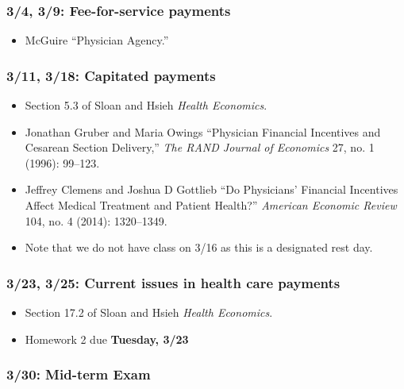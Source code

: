 \documentclass[11pt,]{article}
\providecommand{\tightlist}{%
  \setlength{\itemsep}{0pt}\setlength{\parskip}{0pt}}
\begin{document}
\hypertarget{fee-for-service-payments}{%
\subsubsection{3/4, 3/9: Fee-for-service
payments}\label{fee-for-service-payments}}

\begin{itemize}
\tightlist
\item
  McGuire ``Physician Agency.''
\end{itemize}

\hypertarget{capitated-payments}{%
\subsubsection{3/11, 3/18: Capitated
payments}\label{capitated-payments}}

\begin{itemize}
\tightlist
\item
  Section 5.3 of Sloan and Hsieh \emph{Health Economics}.
\item
  Jonathan Gruber and Maria Owings ``Physician Financial Incentives and
  Cesarean Section Delivery,'' \emph{The RAND Journal of Economics} 27,
  no. 1 (1996): 99--123.
\item
  Jeffrey Clemens and Joshua D Gottlieb ``Do Physicians' Financial
  Incentives Affect Medical Treatment and Patient Health?''
  \emph{American Economic Review} 104, no. 4 (2014): 1320--1349.
\item
  Note that we do not have class on 3/16 as this is a designated rest
  day.
\end{itemize}

\hypertarget{current-issues-in-health-care-payments}{%
\subsubsection{3/23, 3/25: Current issues in health care
payments}\label{current-issues-in-health-care-payments}}

\begin{itemize}
\tightlist
\item
  Section 17.2 of Sloan and Hsieh \emph{Health Economics}.
\item
  Homework 2 due \textbf{Tuesday, 3/23}
\end{itemize}

\hypertarget{mid-term-exam}{%
\subsubsection{3/30: Mid-term Exam}\label{mid-term-exam}}
\end{document}
